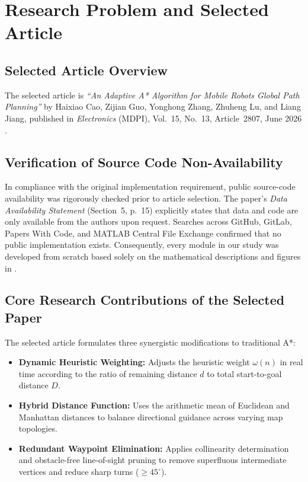 \documentclass[conference]{IEEEtran}
\begin{document}
\section{Research Problem and Selected Article}
\subsection{Selected Article Overview}
The selected article is \textit{``An Adaptive A* Algorithm for Mobile Robots Global Path Planning''} by Haixiao Cao, Zijian Guo, Yonghong Zhang, Zhuheng Lu, and Liang Jiang, published in \textit{Electronics} (MDPI), Vol.~15, No.~13, Article~2807, June 2026 \cite{cao2026adaptive}.

\subsection{Verification of Source Code Non-Availability}
In compliance with the original implementation requirement, public source-code availability was rigorously checked prior to article selection. The paper's \textit{Data Availability Statement} (Section~5, p.~15) explicitly states that data and code are only available from the authors upon request. Searches across GitHub, GitLab, Papers With Code, and MATLAB Central File Exchange confirmed that no public implementation exists. Consequently, every module in our study was developed from scratch based solely on the mathematical descriptions and figures in \cite{cao2026adaptive}.

\subsection{Core Research Contributions of the Selected Paper}
The selected article formulates three synergistic modifications to traditional A*:
\begin{itemize}
    \item \textbf{Dynamic Heuristic Weighting:} Adjusts the heuristic weight $\omega(n)$ in real time according to the ratio of remaining distance $d$ to total start-to-goal distance $D$.
    \item \textbf{Hybrid Distance Function:} Uses the arithmetic mean of Euclidean and Manhattan distances to balance directional guidance across varying map topologies.
    \item \textbf{Redundant Waypoint Elimination:} Applies collinearity determination and obstacle-free line-of-sight pruning to remove superfluous intermediate vertices and reduce sharp turns ($\ge 45^\circ$).
\end{itemize}
\end{document}
